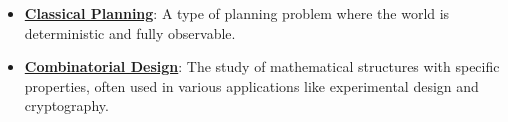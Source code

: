 \documentclass{article}%
\begin{document}
\begin{itemize}[leftmargin=*]
\item \href{https://purdue.brightspace.com/d2l/common/assets/pdfjs-d2l-dist/1.0.14-legacy/web/viewer.html?file=\%2Fcontent\%2Fenforced\%2F1095467-wl.202510.CS.24300.001\%2F13L1-Logic.pdf\%3Fou\%3D1095467\&lang=en-us\&container=d2l-fileviewer-rendered-pdf\&fullscreen=d2l-fileviewer-rendered-pdf-dialog\&height=667#page=21}{\textbf{Classical Planning}}: A type of planning problem where the world is deterministic and fully observable.%
\item \href{https://purdue.brightspace.com/d2l/common/assets/pdfjs-d2l-dist/1.0.14-legacy/web/viewer.html?file=\%2Fcontent\%2Fenforced\%2F1095467-wl.202510.CS.24300.001\%2F13L1-Logic.pdf\%3Fou\%3D1095467\&lang=en-us\&container=d2l-fileviewer-rendered-pdf\&fullscreen=d2l-fileviewer-rendered-pdf-dialog\&height=667#page=22}{\textbf{Combinatorial Design}}: The study of mathematical structures with specific properties, often used in various applications like experimental design and cryptography.%
\end{itemize}

%
\end{document}
